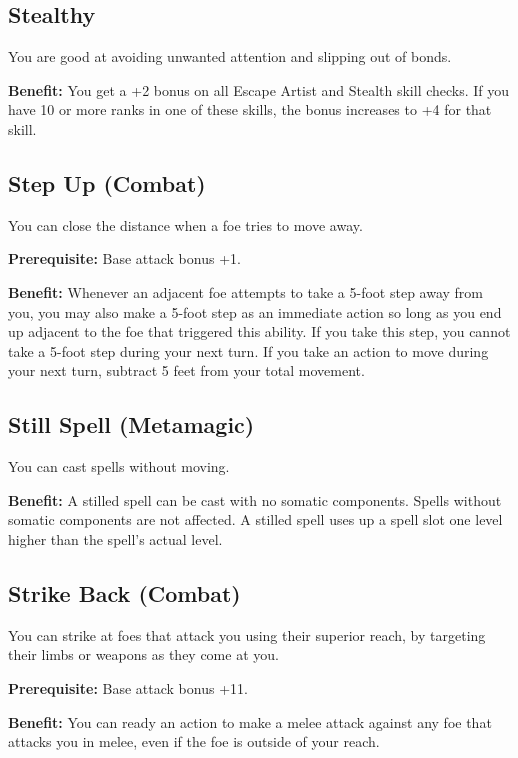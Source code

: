 \subsection{Stealthy}

				
You are good at avoiding unwanted attention and slipping out of bonds.
				
\textbf{Benefit:} You get a +2 bonus on all Escape Artist and Stealth skill checks. If you have 10 or more ranks in one of these skills, the bonus increases to +4 for that skill.
				
\subsection{Step Up (Combat)}

				
You can close the distance when a foe tries to move away.
				
\textbf{Prerequisite:} Base attack bonus +1.
				
\textbf{Benefit:} Whenever an adjacent foe attempts to take a 5-foot step away from you, you may also make a 5-foot step as an immediate action so long as you end up adjacent to the foe that triggered this ability. If you take this step, you cannot take a 5-foot step during your next turn. If you take an action to move during your next turn, subtract 5 feet from your total movement.
				
\subsection{Still Spell (Metamagic)}

				
You can cast spells without moving.
				
\textbf{Benefit:} A stilled spell can be cast with no somatic components. Spells without somatic components are not affected. A stilled spell uses up a spell slot one level higher than the spell's actual level.
				
\subsection{Strike Back (Combat)}

				
You can strike at foes that attack you using their superior reach, by targeting their limbs or weapons as they come at you.
				
\textbf{Prerequisite:} Base attack bonus +11.
				
\textbf{Benefit:} You can ready an action to make a melee attack against any foe that attacks you in melee, even if the foe is outside of your reach.
				
